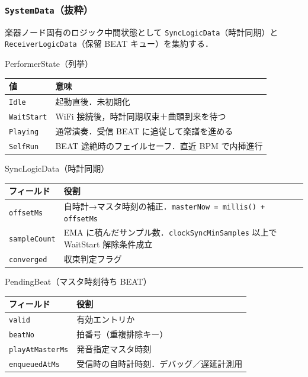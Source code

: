 \documentclass[lualatex,book,paper=a4paper,jafontsize=11.5pt,jafontscale=1.05]{jlreq}
\begin{document}
\subsubsection{\texttt{SystemData}（抜粋）}

楽器ノード固有のロジック中間状態として \texttt{SyncLogicData}（時計同期）と
\texttt{ReceiverLogicData}（保留 BEAT キュー）を集約する．

\begin{apibox}{PerformerState（列挙）}
\begin{tabular}{l p{}}
\toprule
\textbf{値} & \textbf{意味} \\
\midrule
\texttt{Idle}      & 起動直後．未初期化 \\
\texttt{WaitStart} & WiFi 接続後，時計同期収束＋曲頭到来を待つ \\
\texttt{Playing}   & 通常演奏．受信 BEAT に追従して楽譜を進める \\
\texttt{SelfRun}   & BEAT 途絶時のフェイルセーフ．直近 BPM で内挿進行 \\
\bottomrule
\end{tabular}
\end{apibox}

\begin{apibox}{SyncLogicData（時計同期）}
\begin{tabular}{l p{}}
\toprule
\textbf{フィールド} & \textbf{役割} \\
\midrule
\texttt{offsetMs}    & 自時計→マスタ時刻の補正．\texttt{masterNow = millis() + offsetMs} \\
\texttt{sampleCount} & EMA に積んだサンプル数．\texttt{clockSyncMinSamples} 以上で WaitStart 解除条件成立 \\
\texttt{converged}   & 収束判定フラグ \\
\bottomrule
\end{tabular}
\end{apibox}

\begin{apibox}{PendingBeat（マスタ時刻待ち BEAT）}
\begin{tabular}{l p{}}
\toprule
\textbf{フィールド} & \textbf{役割} \\
\midrule
\texttt{valid}          & 有効エントリか \\
\texttt{beatNo}         & 拍番号（重複排除キー） \\
\texttt{playAtMasterMs} & 発音指定マスタ時刻 \\
\texttt{enqueuedAtMs}   & 受信時の自時計時刻．デバッグ／遅延計測用 \\
\bottomrule
\end{tabular}
\end{apibox}
\end{document}
